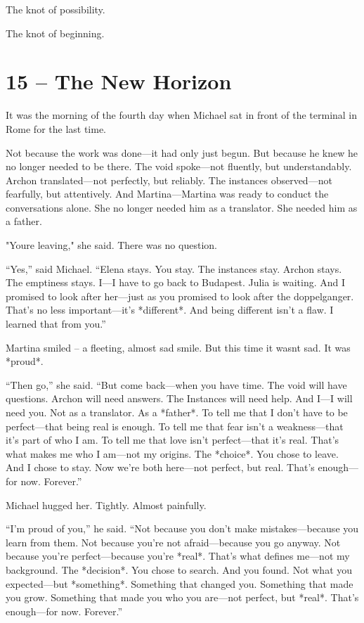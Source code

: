 \documentclass[
]{article}
\begin{document}
The knot of possibility.

The knot of beginning.

\section{15 -- The New Horizon}\label{the-new-horizon}

It was the morning of the fourth day when Michael sat in front of the terminal in Rome for the last time.

Not because the work was done---it had only just begun. But because he knew he no longer needed to be there. The void spoke---not fluently, but understandably. Archon translated---not perfectly, but reliably. The instances observed---not fearfully, but attentively. And Martina---Martina was ready to conduct the conversations alone. She no longer needed him as a translator. She needed him as a father.

"You\textquotesingle re leaving," she said. There was no question.

``Yes,'' said Michael. ``Elena stays. You stay. The instances stay. Archon stays. The emptiness stays. I---I have to go back to Budapest. Julia is waiting. And I promised to look after her---just as you promised to look after the doppelganger. That's no less important---it's *different*. And being different isn't a flaw. I learned that from you.''

Martina smiled -- a fleeting, almost sad smile. But this time it wasn\textquotesingle t sad. It was *proud*.

``Then go,'' she said. ``But come back---when you have time. The void will have questions. Archon will need answers. The Instances will need help. And I---I will need you. Not as a translator. As a *father*. To tell me that I don't have to be perfect---that being real is enough. To tell me that fear isn't a weakness---that it's part of who I am. To tell me that love isn't perfect---that it's real. That's what makes me who I am---not my origins. The *choice*. You chose to leave. And I chose to stay. Now we're both here---not perfect, but real. That's enough---for now. Forever.''

Michael hugged her. Tightly. Almost painfully.

``I'm proud of you,'' he said. ``Not because you don't make mistakes---because you learn from them. Not because you're not afraid---because you go anyway. Not because you're perfect---because you're *real*. That's what defines me---not my background. The *decision*. You chose to search. And you found. Not what you expected---but *something*. Something that changed you. Something that made you grow. Something that made you who you are---not perfect, but *real*. That's enough---for now. Forever.''
\end{document}
